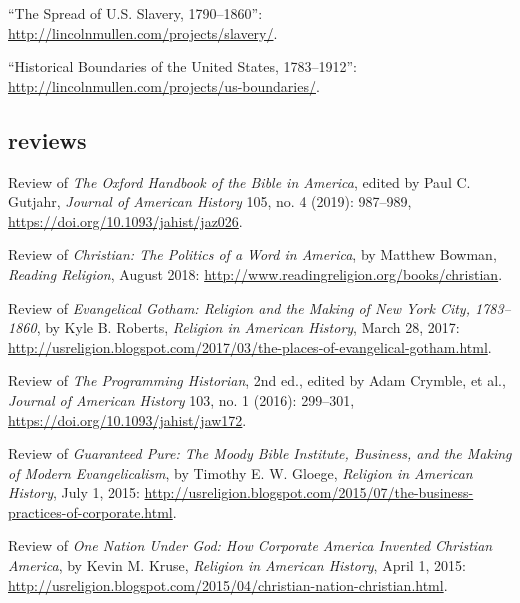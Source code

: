 \documentclass[11pt]{article}
\begin{document}
``The Spread of U.S.  Slavery, 1790--1860'':  
\url{http://lincolnmullen.com/projects/slavery/}.

``Historical Boundaries of the United States, 1783--1912'': 
\url{http://lincolnmullen.com/projects/us-boundaries/}.




\subsection{reviews}\label{book-reviews}

Review of \emph{The Oxford Handbook of the Bible in America}, edited by Paul 
C. Gutjahr, \emph{Journal of American History} 105, no. 4 (2019): 987--989, \url{https://doi.org/10.1093/jahist/jaz026}.

Review of \emph{Christian: The Politics of a Word in America}, by Matthew 
Bowman, \emph{Reading Religion}, August 2018: 
\url{http://www.readingreligion.org/books/christian}.

Review of \emph{Evangelical Gotham: Religion and the Making of New York City, 
  1783--1860}, by Kyle B. Roberts, \emph{Religion in American History}, March 
28, 2017: 
\url{http://usreligion.blogspot.com/2017/03/the-places-of-evangelical-gotham.html}.

Review of \emph{The Programming Historian}, 2nd ed., edited by
Adam Crymble, et al., \emph{Journal of American History} 103, no. 1 (2016): 
299--301, \url{https://doi.org/10.1093/jahist/jaw172}.

Review of \emph{Guaranteed Pure: The Moody Bible Institute, Business, and the 
  Making of Modern Evangelicalism}, by Timothy E. W. Gloege, \emph{Religion in 
  American History}, July 1, 2015: 
  \url{http://usreligion.blogspot.com/2015/07/the-business-practices-of-corporate.html}.

Review of \emph{One Nation Under God: How Corporate America Invented Christian 
  America}, by Kevin M. Kruse, \emph{Religion in American History}, April 1, 
2015: 
\url{http://usreligion.blogspot.com/2015/04/christian-nation-christian.html}.

\end{document}
